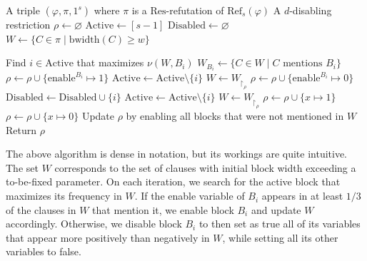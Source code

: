 \begin{breakablealgorithm}
    \caption{A deterministic algorithm $\mathcal{A}$ that reduces block-width}
    \label{algo:algo_block_width}
    \begin{algorithmic}
        \Require A triple $(\varphi, \pi, 1^s)$ where $\pi$ is a $\mathrm{Res}$-refutation of $\mathrm{Ref}_s(\varphi)$
        \Ensure A $d$-disabling restriction
        \State $\rho \gets \varnothing$
        \State $\mathrm{Active} \gets [s-1]$
        \State $\mathrm{Disabled} \gets \varnothing$
        \State $W \gets \{C \in \pi \mid \mathrm{bwidth}(C) \geq w\}$

            \State Find $i \in \mathrm{Active}$ that maximizes $\nu(W, B_i)$
            \State $W_{B_i} \gets \{C \in W \mid C \text{ mentions } B_i\}$
                \State $\rho \gets \rho \cup \{\mathrm{enable}^{B_i} \mapsto 1\}$
                \State $\mathrm{Active} \gets \mathrm{Active} \setminus \{i\}$
                \State $W \gets W_{\upharpoonright_{\rho}}$
            \Else
                \State $\rho \gets \rho \cup \{\mathrm{enable}^{B_i} \mapsto 0\}$
                \State $\mathrm{Disabled} \gets \mathrm{Disabled} \cup \{i\}$
                \State $\mathrm{Active} \gets \mathrm{Active} \setminus \{i\}$
                \State $W \gets W_{\upharpoonright_{\rho}}$
                        \State $\rho \gets \rho \cup \{x \mapsto 1\}$
                    \Else
                        \State $\rho \gets \rho \cup \{x \mapsto 0\}$
                    \EndIf
                \EndFor
            \EndIf
        \EndWhile
        \State Update $\rho$ by enabling all blocks that were not mentioned in $W$
        \State Return $\rho$
    \end{algorithmic}
\end{breakablealgorithm}

The above algorithm is dense in notation, but its workings are quite intuitive. The set $W$ corresponds to the set of clauses with initial block width exceeding a to-be-fixed parameter. On each iteration, we search for the active block that maximizes its frequency in $W$. If the enable variable of $B_i$ appears in at least $1/3$ of the clauses in $W$ that mention it, we enable block $B_i$ and update $W$ accordingly. Otherwise, we disable block $B_i$ to then set as true all of its variables that appear more positively than negatively in $W$, while setting all its other variables to false.

